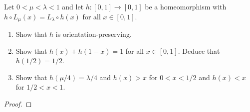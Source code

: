 \begin{problem}{7}
  Let $0 <\mu < \lambda < 1$ and let $h: [0, 1] \to [0, 1]$ be a homeomorphism
  with $h \circ L_\mu(x) = L_\lambda \circ h (x)$ for all $x\in [0, 1]$.
  \begin{enumerate}
    \item Show that $h$ is orientation-preserving.
    \item Show that $h(x) + h(1-x) = 1$ for all $x\in [0, 1]$. Deduce that $h(1/2) = 1/2$.
    \item Show that $h(\mu/4) = \lambda /4$ and $h(x) > x$ for $0 < x < 1/2$ and $h(x) < x$ for
      $1/2 < x < 1$.
  \end{enumerate}
\end{problem}

\begin{proof}
\end{proof}
\newpage
